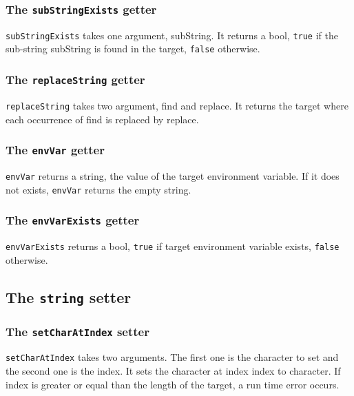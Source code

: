 \documentclass[10pt,openright,twosides,final]{memoir}
\newcommand{\gtlarg}[1]{{\footnotesize\ttfamily\colorbox{light-blue}{#1}}}
\newcommand{\gtlinline}[1]{\colorbox{light-blue}{\lstinline[language=gtl]{#1}}}
\begin{document}
\subsubsection{The \texttt{subStringExists} getter}

\gtlinline{subStringExists} takes one argument, \gtlarg{subString}. It returns a bool, \gtlinline{true} if the sub-string \gtlarg{subString} is found in the target, \gtlinline{false} otherwise.

\subsubsection{The \texttt{replaceString} getter}

\gtlinline{replaceString} takes two argument, \gtlarg{find} and \gtlarg{replace}. It returns the target where each occurrence of \gtlarg{find} is replaced by \gtlarg{replace}.

\subsubsection{The \texttt{envVar} getter}

\gtlinline{envVar} returns a string, the value of the target environment variable. If it does not exists, \gtlinline{envVar} returns the empty string.

\subsubsection{The \texttt{envVarExists} getter}

\gtlinline{envVarExists} returns a bool, \gtlinline{true} if target environment variable exists, \gtlinline{false} otherwise.

\subsection{The \texttt{string} setter}

\subsubsection{The \texttt{setCharAtIndex} setter}

\gtlinline{setCharAtIndex} takes two arguments. The first one is the \gtlarg{character} to set and the second one is the \gtlarg{index}. It sets the character at index \gtlarg{index} to \gtlarg{character}. If \gtlarg{index} is greater or equal than the length of the target, a run time error occurs.
\end{document}
